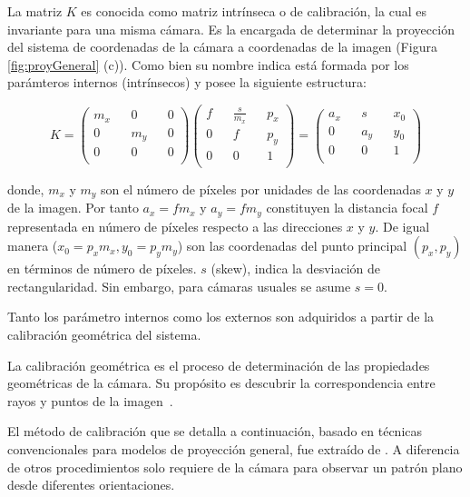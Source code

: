 La matriz $K$ es conocida como matriz intrínseca o de calibración, la cual es invariante para una misma cámara. Es la encargada de determinar la proyección del sistema de coordenadas de la cámara a coordenadas de la imagen (Figura \ref{fig:proyGeneral} (c)). Como bien su nombre indica está formada por los parámteros internos (intrínsecos) y posee la siguiente estructura:

\begin{equation}
	K = \begin{pmatrix}
		m_x && 0 && 0 \\
		0 && m_y && 0 \\
		0 && 0 && 0 \\
	\end{pmatrix}
	\begin{pmatrix}
		f && \frac{s}{m_x} && p_x \\
		0 && f && p_y \\
		0 && 0 && 1 \\
	\end{pmatrix} =
	\begin{pmatrix}
		a_x && s && x_0 \\
		0 && a_y && y_0 \\
		0 && 0 && 1 \\
	\end{pmatrix}
\end{equation}

donde, $m_x$ y $m_y$ son el número de píxeles por unidades de las coordenadas $x$ y $y$ de la imagen. Por tanto $a_x = fm_x$ y $a_y = fm_y$ constituyen la distancia focal $f$ representada en número de píxeles respecto a las direcciones $x$ y $y$. De igual manera ($x_0 = p_xm_x, y_0 = p_ym_y$) son las coordenadas del punto principal $(p_x, p_y)$ en términos de número de píxeles. $s$ (skew), indica la desviación de rectangularidad. Sin embargo, para cámaras usuales se asume $s=0$.

Tanto los parámetro internos como los externos son adquiridos a partir de la calibración geométrica del sistema.

\begin{definition}
	La calibración geométrica es el proceso de determinación de las propiedades geométricas de la cámara. Su propósito es descubrir la correspondencia entre rayos y puntos de la imagen~\cite{kannala2008geometric}.
\end{definition}

El método de calibración que se detalla a continuación, basado en técnicas convencionales para modelos de proyección general, fue extraído de \cite{zhang2000flexible}. A diferencia de otros procedimientos solo requiere de la cámara para observar un patrón plano desde diferentes orientaciones.

